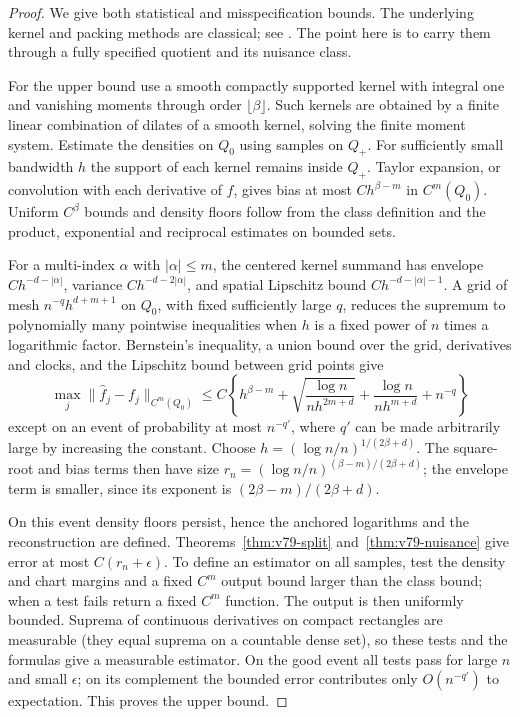 \begin{proof}
We give both statistical and misspecification bounds.  The underlying
kernel and packing methods are classical; see
\cite{GineGuillou2002,GineNickl2009,Tsybakov2009}.  The point here is to
carry them through a fully specified quotient and its nuisance class.

For the upper bound use a smooth compactly supported kernel with integral
one and vanishing moments through order $\lfloor\beta\rfloor$.
Such kernels are obtained by a finite linear combination of dilates
of a smooth kernel, solving the finite moment system.  Estimate the
densities on $Q_0$ using samples on $Q_+$.  For sufficiently small
bandwidth $h$ the support of each kernel remains inside $Q_+$.
Taylor expansion, or convolution with each derivative of $f$, gives
bias at most $Ch^{\beta-m}$ in $C^m(Q_0)$.  Uniform $C^\beta$ bounds
and density floors follow from the class definition and the product,
exponential and reciprocal estimates on bounded sets.

For a multi-index $\alpha$ with $|\alpha|\le m$, the centered
kernel summand has envelope $Ch^{-d-|\alpha|}$, variance
$Ch^{-d-2|\alpha|}$, and spatial Lipschitz bound
$Ch^{-d-|\alpha|-1}$.  A grid of mesh $n^{-q}h^{d+m+1}$ on $Q_0$,
with fixed sufficiently large $q$, reduces the supremum to polynomially
many pointwise inequalities when $h$ is a fixed power of $n$ times a
logarithmic factor.  Bernstein's inequality, a union bound over the
grid, derivatives and clocks, and the Lipschitz bound between grid
points give
\begin{equation}\label{eq:v79-kernel}
 \max_j\|\widehat f_j-f_j\|_{C^m(Q_0)}
 \le C\left\{h^{\beta-m}
       +\sqrt{\frac{\log n}{nh^{2m+d}}}
       +\frac{\log n}{nh^{m+d}}+n^{-q}\right\}
\end{equation}
except on an event of probability at most $n^{-q'}$, where $q'$ can
be made arbitrarily large by increasing the constant.  Choose
$h=(\log n/n)^{1/(2\beta+d)}$.  The square-root and bias terms then
have size
$r_n=(\log n/n)^{(\beta-m)/(2\beta+d)}$; the envelope term is
smaller, since its exponent is $(2\beta-m)/(2\beta+d)$.

On this event density floors persist, hence the anchored logarithms
and the reconstruction are defined.  Theorems~\ref{thm:v79-split}
and~\ref{thm:v79-nuisance} give error at most $C(r_n+\epsilon)$.
To define an estimator on all samples, test the density and chart
margins and a fixed $C^m$ output bound larger than the class bound;
when a test fails return a fixed $C^m$ function.  The output is then
uniformly bounded.  Suprema of continuous derivatives on compact
rectangles are measurable (they equal suprema on a countable dense
set), so these tests and the formulas give a measurable estimator.
On the good event all tests pass for large $n$ and small $\epsilon$;
on its complement the bounded error contributes only $O(n^{-q'})$
to expectation.  This proves the upper bound.


\end{proof}
